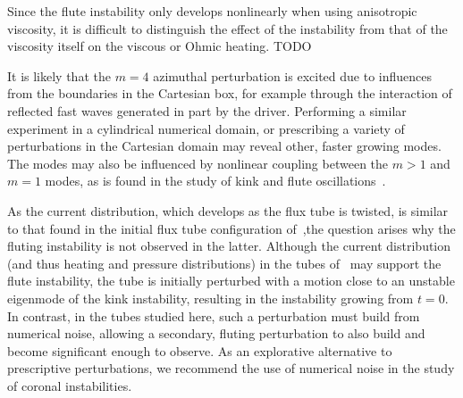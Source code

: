 \documentclass[fleqn,usenatbib]{mnras}
\newcommand{\rev}[1]{{\color{red} {#1}}}
\begin{document}
\rev{Since the flute instability only develops nonlinearly when using anisotropic viscosity, it is difficult to distinguish the effect of the instability from that of the viscosity itself on the viscous or Ohmic heating. TODO}

It is likely that the $m=4$ azimuthal perturbation is excited due to influences
from the boundaries in the Cartesian box, for example through the interaction
of reflected fast waves generated in part by the driver. Performing a similar
experiment in a cylindrical numerical domain, or prescribing a variety of
perturbations in the Cartesian domain may reveal other, faster growing modes.
The modes may also be influenced by nonlinear coupling between the $m>1$ and
$m=1$ modes, as is found in the study of kink and flute
oscillations~\citep{terradasEffectMagneticTwist2018,rudermanNonlinearGenerationFluting2017}. 

As the current distribution, which develops as the flux tube is twisted, is
similar to that found in the initial flux tube configuration
of~\cite{quinnEffectAnisotropicViscosity2020},the question arises why the
fluting instability is not observed in the latter. Although the current
distribution (and thus heating and pressure distributions) in the tubes
of~\cite{quinnEffectAnisotropicViscosity2020} may support the flute
instability, the tube is initially perturbed with a motion close to an unstable
eigenmode of the kink instability, resulting in the instability growing from
$t=0$. In contrast, in the tubes studied here, such a perturbation must build
from numerical noise, allowing a secondary, fluting perturbation to also build
and become significant enough to observe. \rev{As an explorative alternative to
prescriptive perturbations, we recommend the use of numerical noise in the
study of coronal instabilities.}
\end{document}
